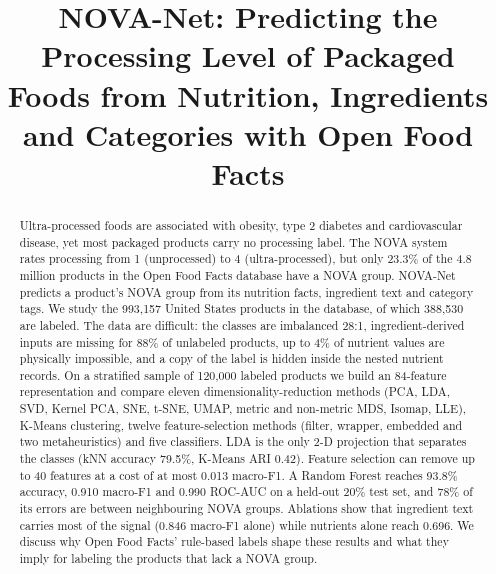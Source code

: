 \documentclass[conference]{IEEEtran}
\begin{document}
\title{NOVA-Net: Predicting the Processing Level of Packaged Foods from Nutrition, Ingredients and Categories with Open Food Facts}

\author{
\and
{}
}

\maketitle

\begin{abstract}
Ultra-processed foods are associated with obesity, type 2 diabetes and cardiovascular disease, yet most packaged products carry no processing label. The NOVA system rates processing from 1 (unprocessed) to 4 (ultra-processed), but only 23.3\% of the 4.8 million products in the Open Food Facts database have a NOVA group. NOVA-Net predicts a product's NOVA group from its nutrition facts, ingredient text and category tags. We study the 993,157 United States products in the database, of which 388,530 are labeled. The data are difficult: the classes are imbalanced 28:1, ingredient-derived inputs are missing for 88\% of unlabeled products, up to 4\% of nutrient values are physically impossible, and a copy of the label is hidden inside the nested nutrient records. On a stratified sample of 120,000 labeled products we build an 84-feature representation and compare eleven dimensionality-reduction methods (PCA, LDA, SVD, Kernel PCA, SNE, t-SNE, UMAP, metric and non-metric MDS, Isomap, LLE), K-Means clustering, twelve feature-selection methods (filter, wrapper, embedded and two metaheuristics) and five classifiers. LDA is the only 2-D projection that separates the classes (kNN accuracy 79.5\%, K-Means ARI 0.42). Feature selection can remove up to 40 features at a cost of at most 0.013 macro-F1. A Random Forest reaches 93.8\% accuracy, 0.910 macro-F1 and 0.990 ROC-AUC on a held-out 20\% test set, and 78\% of its errors are between neighbouring NOVA groups. Ablations show that ingredient text carries most of the signal (0.846 macro-F1 alone) while nutrients alone reach 0.696. We discuss why Open Food Facts' rule-based labels shape these results and what they imply for labeling the products that lack a NOVA group.
\end{abstract}
\end{document}
